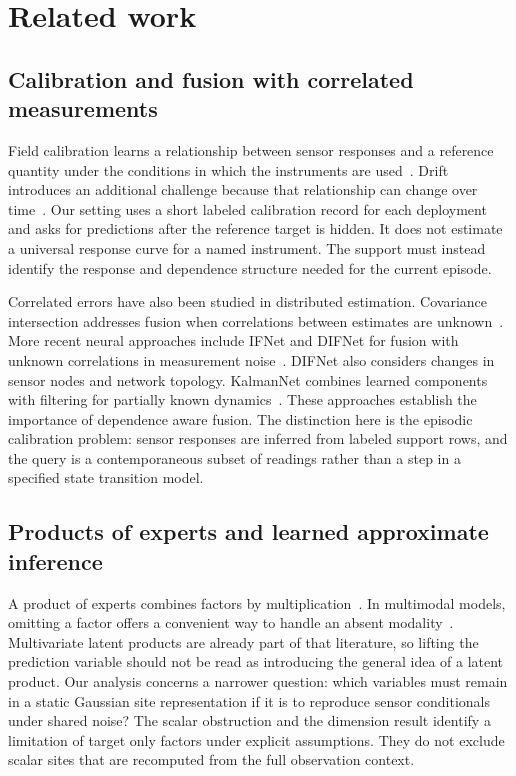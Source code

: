 \section{Related work}
\label{sec:related}

\subsection{Calibration and fusion with correlated measurements}

Field calibration learns a relationship between sensor responses and a reference quantity under the conditions in which the instruments are used~\citep{devito2008airquality,zimmerman2018calibration}. Drift introduces an additional challenge because that relationship can change over time~\citep{vergara2012drift}. Our setting uses a short labeled calibration record for each deployment and asks for predictions after the reference target is hidden. It does not estimate a universal response curve for a named instrument. The support must instead identify the response and dependence structure needed for the current episode.

Correlated errors have also been studied in distributed estimation. Covariance intersection addresses fusion when correlations between estimates are unknown~\citep{julier1997ci}. More recent neural approaches include IFNet and DIFNet for fusion with unknown correlations in measurement noise~\citep{wang2025ifnet,dong2025difnet}. DIFNet also considers changes in sensor nodes and network topology. KalmanNet combines learned components with filtering for partially known dynamics~\citep{revach2022kalmannet}. These approaches establish the importance of dependence aware fusion. The distinction here is the episodic calibration problem: sensor responses are inferred from labeled support rows, and the query is a contemporaneous subset of readings rather than a step in a specified state transition model.

\subsection{Products of experts and learned approximate inference}

A product of experts combines factors by multiplication~\citep{hinton2002poe}. In multimodal models, omitting a factor offers a convenient way to handle an absent modality~\citep{wu2018mvae,ma2021smil}. Multivariate latent products are already part of that literature, so lifting the prediction variable should not be read as introducing the general idea of a latent product. Our analysis concerns a narrower question: which variables must remain in a static Gaussian site representation if it is to reproduce sensor conditionals under shared noise? The scalar obstruction and the dimension result identify a limitation of target only factors under explicit assumptions. They do not exclude scalar sites that are recomputed from the full observation context.

